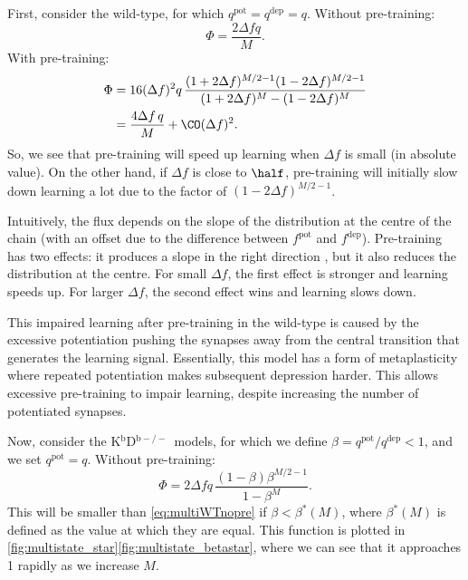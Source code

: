 \documentclass[10pt]{article}
\newcommand{\pot}{^{\text{pot}}}
\newcommand{\dep}{^{\text{dep}}}
\newcommand{\KO}{K$^\mathrm{b}$D$^{\mathrm{b}-/-}$}
\begin{document}
First, consider the wild-type, for which $q\pot=q\dep=q$.
Without pre-training:
%
\begin{equation}\label{eq:multiWTnopre}
  \Phi = \frac{2{\Delta f}q}{M}.
\end{equation}
%
With pre-training:
%
\begin{equation}\label{eq:multiWTpre}
\begin{aligned}
  \Phi &= 16(\Delta f)^2q \, \frac{(1+2\Delta f)^{M/2-1} (1-2\Delta f)^{M/2-1}}
          {(1+2\Delta f)^M - (1-2\Delta f)^M} \\
       &= \frac{4{\Delta f}\,q}{M} + \CO(\Delta f)^2.
\end{aligned}
\end{equation}
%
So, we see that pre-training will speed up learning when $\Delta f$ is small (in absolute value).
On the other hand, if $\Delta f$ is close to $\half$, pre-training will initially slow down learning a lot due to the factor of $(1-2\Delta f)^{M/2-1}$.

Intuitively, the flux depends on the slope of the distribution at the centre of the chain (with an offset due to the difference between $f\pot$ and $f\dep$).
Pre-training has two effects: it produces a slope in the right direction
, but it also reduces the distribution at the centre.
For small $\Delta f$, the first effect is stronger and learning speeds up.
For larger $\Delta f$, the second effect wins and learning slows down.

This impaired learning after pre-training in the wild-type is caused by the excessive potentiation pushing the synapses away from the central transition that generates the learning signal.
Essentially, this model has a form of metaplasticity where repeated potentiation makes subsequent depression harder.
This allows excessive pre-training to impair learning, despite increasing the number of potentiated synapses.


Now, consider the \KO\ models, for which we define $\beta=q\pot/q\dep<1$, and we set $q\pot=q$.
Without pre-training:
%
\begin{equation}\label{eq:multiKOnopre}
  \Phi = 2{\Delta f} q\,\frac{(1-\beta)\beta^{M/2-1}}{1-\beta^M}.
\end{equation}
%
This will be smaller than \eqref{eq:multiWTnopre} if $\beta<\beta^*(M)$, where $\beta^*(M)$ is defined as the value at which they are equal.
This function is plotted in \autoref{fig:multistate_star}\ref{fig:multistate_betastar}, where we can see that it approaches 1 rapidly as we increase $M$.
\end{document}
